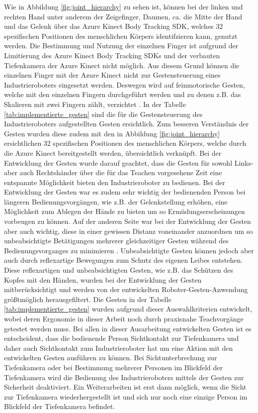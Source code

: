 Wie in Abbildung \ref{fig:joint_hierarchy} zu sehen ist, können bei der linken und rechten Hand unter anderem der Zeigefinger, Daumen, ca. die Mitte der Hand und das Gelenk über das Azure Kinect Body Tracking SDK, welches 32 spezifischen Positionen des menschlichen Körpers identifzieren kann, genutzt werden. Die Bestimmung und Nutzung der einzelnen Finger ist aufgrund der Limitierung des Azure Kinect Body Tracking SDKs und der verbauten Tiefenkamera der Azure Kinect nicht möglich. Aus diesem Grund können die einzelnen Finger mit der Azure Kinect nicht zur Gestensteuerung eines Industrieroboters eingesetzt werden. Deswegen wird auf feinmotorische Gesten, welche mit den einzelnen Fingern durchgeführt werden und zu denen z.B. das Skalieren mit zwei Fingern zählt, verzichtet \cite{qm13_azure_joints_nodate}. In der Tabelle \ref{tab:implementierte_gesten} sind die für die Gestensteuerung des Industrieroboters aufgestellten Gesten ersichtlich. Zum besseren Verständnis der Gesten wurden diese zudem mit den in Abbildung \ref{fig:joint_hierarchy} ersichtlichen 32 spezifischen Positionen des menschlichen Körpers, welche durch die Azure Kinect bereitgestellt werden, übersichtlich verknüpft. Bei der Entwicklung der Gesten wurde darauf geachtet, dass die Gesten für sowohl Links- aber auch Rechtshänder über die für das Teachen vorgesehene Zeit eine entspannte Möglichkeit bieten den Industrieroboter zu bedienen. Bei der Entwicklung der Gesten war es zudem sehr wichtig der bedienenden Person bei längeren Bedienungsvorgängen, wie z.B. der Gelenkstellung erhöhen, eine Möglichkeit zum Ablegen der Hände zu bieten um so Ermüdungserscheinungen vorbeugen zu können. Auf der anderen Seite war bei der Entwicklung der Gesten aber auch wichtig, diese in einer gewissen Distanz voneinander anzuordnen um so unbeabsichtigte Betätigungen mehrerer gleichzeitiger Gesten während des Bedienungsvorganges zu minimieren \cite{proff_radikale_2013}. Unbeabsichtigte Gesten können jedoch aber auch durch reflexartige Bewegungen zum Schutz des eigenen Leibes entstehen. Diese reflexartigen und unbeabsichtigten Gesten, wie z.B. das Schützen des Kopfes mit den Händen, \cite[95]{matschnig_korpersprache_2007} wurden bei der Entwicklung der Gesten mitberücksichtigt und werden von der entwickelten Roboter-Gesten-Anwendung größtmöglich herausgefiltert. Die Gesten in der Tabelle \ref{tab:implementierte_gesten} wurden aufgrund dieser Auswahlkriterien entwickelt, wobei deren Ergonomie in dieser Arbeit noch durch praxisnahe Teachvorgänge getestet werden muss. Bei allen in dieser Ausarbeitung entwickelten Gesten ist es entscheident, dass die bedienende Person Sichtkontakt zur Tiefenkamera und daher auch Sichtkontakt zum Industrieroboter hat um eine Aktion mit den entwickelten Gesten ausführen zu können. Bei Sichtunterbrechung zur Tiefenkamera oder bei Bestimmung mehrerer Personen im Blickfeld der Tiefenkamera wird die Bedienung des Industrieroboters mittels der Gesten zur Sicherheit deaktiviert. Ein Weiterarbeiten ist erst dann möglich, wenn die Sicht zur Tiefenkamera wiederhergestellt ist und sich nur noch eine einzige Person im Blickfeld der Tiefenkamera befindet.\newline

